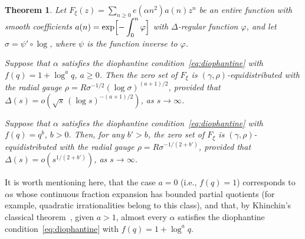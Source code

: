 \documentclass[11pt]{amsart}
\numberwithin{equation}{section}
\newtheorem{theorem}{Theorem}
\begin{document}
\begin{theorem}\label{thm:diophnatine}
Let $F_\xi (z) = \sum_{n\ge 0} e(\alpha n^2) a(n) z^n $ be an entire function with smooth
coefficients $a(n) = \exp\Bigl[ -\displaystyle \int_0^n \varphi \Bigr]$ with $\Delta$-regular
function $\varphi$, and let $\sigma=\psi'\circ\log$,
where $\psi$ is the function inverse to $\varphi$.

\smallskip{}
Suppose that $\alpha$ satisfies the diophantine condition~\eqref{eq:diophantine} with
$f(q)=1+\log^a q$, $a\ge 0$. Then
the zero set of $F_\xi$ is $(\gamma, \rho)$-equidistributed with the radial gauge $\rho=R\sigma^{-1/2}(\log\sigma)^{(a+1)/2}$, provided that
$\Delta(s) = o( \sqrt{s}\,(\log s)^{-(a+1)/2})$, as $s\to\infty$.

\smallskip{}
Suppose that $\alpha$ satisfies the diophantine condition~\eqref{eq:diophantine} with
$f(q)=q^b$, $b>0$. Then, for any $b'>b$,
the zero set of $F_\xi$ is $(\gamma, \rho)$-equidistributed with the radial gauge $\rho=R\sigma^{-1/(2+b')}$, provided that
$\Delta (s) = o(s^{1/(2+b')})$, as $s\to\infty$.
\end{theorem}

It is worth mentioning here, that the case $a=0$ (i.e., $f(q)=1$)
corresponds to $\alpha$s whose continuous fraction expansion has bounded partial quotients
(for example, quadratic irrationalities belong to this class), and that, by Khinchin's classical theorem~\cite[\S14]{Khinchin}, given $a>1$, almost every $\alpha$ satisfies the diophantine condition~\eqref{eq:diophantine} with $f(q)=1+\log^a q$.
\end{document}
